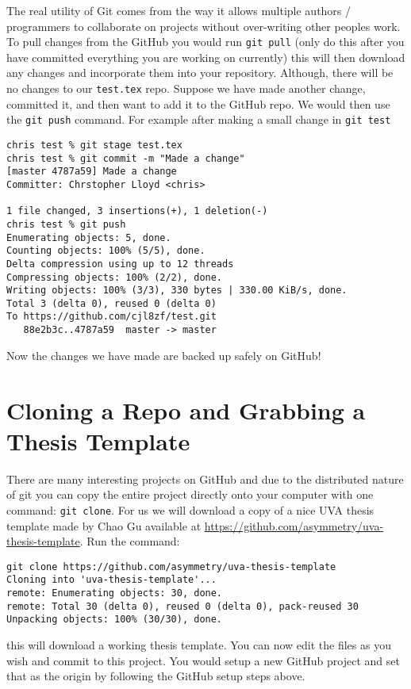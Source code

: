 \documentclass{article}
\begin{document}
The real utility of Git comes from the way it allows multiple authors
/ programmers to collaborate on projects without over-writing other
peoples work. To pull changes from the GitHub you would run
\lstinline{git pull} (only do this after you have committed
everything you are working on currently) this will then download any
changes and incorporate them into your repository. Although, there
will be no changes to our \lstinline{test.tex} repo. Suppose we have
made another change, committed it, and then want to add it to the
GitHub repo. We would then use the \lstinline{git push} command. For
example after making a small change in \lstinline{git test}
\begin{lstlisting}
chris test % git stage test.tex
chris test % git commit -m "Made a change"
[master 4787a59] Made a change
Committer: Chrstopher Lloyd <chris>

1 file changed, 3 insertions(+), 1 deletion(-)
chris test % git push
Enumerating objects: 5, done.
Counting objects: 100% (5/5), done.
Delta compression using up to 12 threads
Compressing objects: 100% (2/2), done.
Writing objects: 100% (3/3), 330 bytes | 330.00 KiB/s, done.
Total 3 (delta 0), reused 0 (delta 0)
To https://github.com/cjl8zf/test.git
   88e2b3c..4787a59  master -> master
\end{lstlisting}

Now the changes we have made are backed up safely on GitHub!

\section{Cloning a Repo and Grabbing a Thesis Template}
There are many interesting projects on GitHub and due to the
distributed nature of git you can copy the entire project directly
onto your computer with one command: \lstinline{git clone}. For us we
will download a copy of a nice UVA thesis template made by Chao Gu
available at
\href{https://github.com/asymmetry/uva-thesis-template}{https://github.com/asymmetry/uva-thesis-template}. Run
the command:
\begin{lstlisting}
git clone https://github.com/asymmetry/uva-thesis-template
Cloning into 'uva-thesis-template'...
remote: Enumerating objects: 30, done.
remote: Total 30 (delta 0), reused 0 (delta 0), pack-reused 30
Unpacking objects: 100% (30/30), done.
\end{lstlisting}
this will download a working thesis template. You can now edit the
files as you wish and commit to this project. You would setup a new
GitHub project and set that as the origin by following the GitHub
setup steps above.
\end{document}
